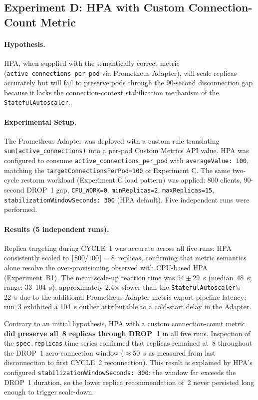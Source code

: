\documentclass[twocolumn]{svjour3}
\begin{document}
\subsection{Experiment D: HPA with Custom Connection-Count Metric}
\label{sec:experiment_d}

\paragraph{Hypothesis.} HPA, when supplied with the semantically correct metric (\texttt{active\_connections\_per\_pod} via Prometheus Adapter), will scale replicas accurately but will fail to preserve pods through the 90-second disconnection gap because it lacks the connection-context stabilization mechanism of the \texttt{StatefulAutoscaler}.

\paragraph{Experimental Setup.} The Prometheus Adapter was deployed with a custom rule translating \texttt{sum(active\_connections)} into a per-pod Custom Metrics API value. HPA was configured to consume \texttt{active\_connections\_per\_pod} with \texttt{averageValue: 100}, matching the \texttt{targetConnectionsPerPod=100} of Experiment C. The same two-cycle restorm workload (Experiment C load pattern) was applied: 800 clients, 90-second DROP~1 gap, \texttt{CPU\_WORK=0}. \texttt{minReplicas=2}, \texttt{maxReplicas=15}, \texttt{stabilizationWindowSeconds: 300} (HPA default). Five independent runs were performed.

\paragraph{Results (5 independent runs).}
Replica targeting during CYCLE~1 was accurate across all five runs: HPA consistently scaled to $\lceil800/100\rceil = 8$~replicas, confirming that metric semantics alone resolve the over-provisioning observed with CPU-based HPA (Experiment~B1).  The mean scale-up reaction time was $54 \pm 29$~s (median~48~s; range: 33--104~s), approximately 2.4$\times$ slower than the \texttt{StatefulAutoscaler}'s 22~s due to the additional Prometheus Adapter metric-export pipeline latency; run~3 exhibited a 104~s outlier attributable to a cold-start delay in the Adapter.

Contrary to an initial hypothesis, HPA with a custom connection-count metric \textbf{did preserve all~8 replicas through DROP~1} in all five runs.  Inspection of the \texttt{spec.replicas} time series confirmed that replicas remained at~8 throughout the DROP~1 zero-connection window ($\approx$50~s as measured from last disconnection to first CYCLE~2 reconnection).  This result is explained by HPA's configured \texttt{stabilizationWindowSeconds:~300}: the window far exceeds the DROP~1 duration, so the lower replica recommendation of~2 never persisted long enough to trigger scale-down.
\end{document}
